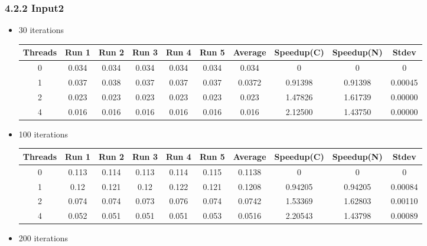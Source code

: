 \subsubsection*{4.2.2 Input2} 
 \begin{itemize}
\item 30 iterations
\begin{center}
 \begin{adjustbox}{width=\columnwidth, center} 
 \begin{tabular}{ | |c | c c c c c | c | c c | c | |} \hline 
 Threads & Run 1 & Run 2 & Run 3 & Run 4 & Run 5 & Average & Speedup(C) & Speedup(N) & Stdev \\ [0.5ex] 
 \hline 
 \hline 
0& 0.034 & 0.034 & 0.034 & 0.034 & 0.034 & 0.034 & 0 & 0 & 0\\ 
 \hline
1& 0.037 & 0.038 & 0.037 & 0.037 & 0.037 & 0.0372 & 0.91398 & 0.91398 & 0.00045\\ 
 \hline
2& 0.023 & 0.023 & 0.023 & 0.023 & 0.023 & 0.023 & 1.47826 & 1.61739 & 0.00000\\ 
 \hline
4& 0.016 & 0.016 & 0.016 & 0.016 & 0.016 & 0.016 & 2.12500 & 1.43750 & 0.00000\\ 
 \hline
\end{tabular} 
 \end{adjustbox} 
 \end{center} 
\item 100 iterations
\begin{center}
 \begin{adjustbox}{width=\columnwidth, center} 
 \begin{tabular}{ | |c | c c c c c | c | c c | c | |} \hline 
 Threads & Run 1 & Run 2 & Run 3 & Run 4 & Run 5 & Average & Speedup(C) & Speedup(N) & Stdev \\ [0.5ex] 
 \hline 
 \hline 
0& 0.113 & 0.114 & 0.113 & 0.114 & 0.115 & 0.1138 & 0 & 0 & 0\\ 
 \hline
1& 0.12 & 0.121 & 0.12 & 0.122 & 0.121 & 0.1208 & 0.94205 & 0.94205 & 0.00084\\ 
 \hline
2& 0.074 & 0.074 & 0.073 & 0.076 & 0.074 & 0.0742 & 1.53369 & 1.62803 & 0.00110\\ 
 \hline
4& 0.052 & 0.051 & 0.051 & 0.051 & 0.053 & 0.0516 & 2.20543 & 1.43798 & 0.00089\\ 
 \hline
\end{tabular} 
 \end{adjustbox} 
 \end{center} 
\item 200 iterations
\begin{center}

\end{center}
\end{itemize}
